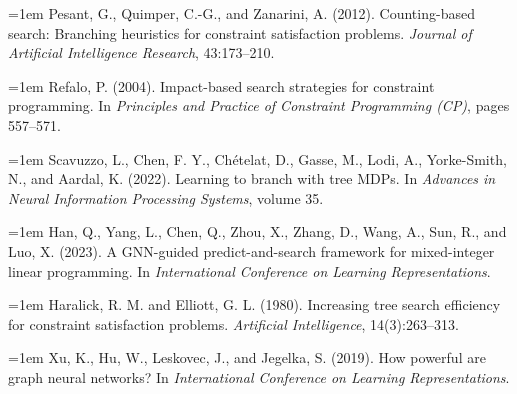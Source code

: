\documentclass[final,5p,twocolumn]{elsarticle}
\begin{document}
{\noindent\hangindent=1em Pesant, G., Quimper, C.-G., and Zanarini, A. (2012). Counting-based search: Branching heuristics for constraint satisfaction problems. \textit{Journal of Artificial Intelligence Research}, 43:173–210.\par\smallskip
\noindent\hangindent=1em Refalo, P. (2004). Impact-based search strategies for constraint programming. In \textit{Principles and Practice of Constraint Programming (CP)}, pages 557–571.\par\smallskip
\noindent\hangindent=1em Scavuzzo, L., Chen, F. Y., Chételat, D., Gasse, M., Lodi, A., Yorke-Smith, N., and Aardal, K. (2022). Learning to branch with tree MDPs. In \textit{Advances in Neural Information Processing Systems}, volume 35.\par\smallskip
\noindent\hangindent=1em Han, Q., Yang, L., Chen, Q., Zhou, X., Zhang, D., Wang, A., Sun, R., and Luo, X. (2023). A GNN-guided predict-and-search framework for mixed-integer linear programming. In \textit{International Conference on Learning Representations}.\par\smallskip
\noindent\hangindent=1em Haralick, R. M. and Elliott, G. L. (1980). Increasing tree search efficiency for constraint satisfaction problems. \textit{Artificial Intelligence}, 14(3):263–313.\par\smallskip
\noindent\hangindent=1em Xu, K., Hu, W., Leskovec, J., and Jegelka, S. (2019). How powerful are graph neural networks? In \textit{International Conference on Learning Representations}.\par\smallskip}
\end{document}
